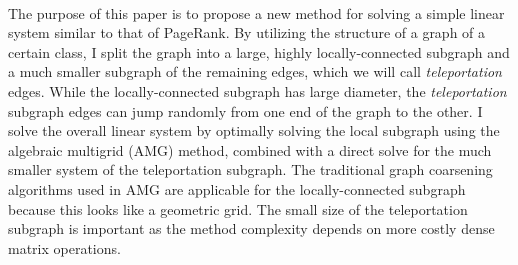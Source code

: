 \\
The purpose of this paper is to propose a new method for solving a simple linear system similar to that of PageRank. By utilizing the structure of a graph of a certain class, I split the graph into a large, highly locally-connected subgraph and a much smaller subgraph of the remaining edges, which we will call \textit{teleportation} edges. While the locally-connected subgraph has large diameter, the \textit{teleportation} subgraph edges can jump randomly from one end of the graph to the other. I solve the overall linear system by optimally solving the local subgraph using the algebraic multigrid (AMG) method, combined with a direct solve for the much smaller system of the teleportation subgraph. The traditional graph coarsening algorithms used in AMG are applicable for the locally-connected subgraph because this looks like a geometric grid. The small size of the teleportation subgraph is important as the method complexity depends on more costly dense matrix operations.



%
%
%